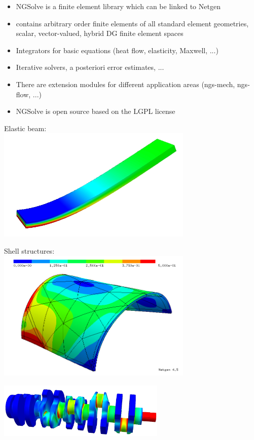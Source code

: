 \documentclass[20pt,landscape,footrule]{foils}
\begin{document}
\foilhead{\color{blue}
{\bf What is NGSolve ? } }
\begin{itemize}
\item NGSolve is a finite element library which can be linked to Netgen
\item contains arbitrary order finite elements of all standard element geometries,
scalar, vector-valued, hybrid DG finite element spaces
\item Integrators for basic equations (heat flow, elasticity, Maxwell, ...)
\item Iterative solvers, a posteriori error estimates, ...
\item There are extension modules for different application areas (ngs-mech, ngs-flow, ...)
\item NGSolve is open source based on the LGPL license
\end{itemize}


%
\begin{center}
\begin{minipage}[t]{0.4\textwidth}
Elastic beam: \\
\includegraphics[width=0.7\textwidth]{beam_sol.jpg}
\end{minipage}
\begin{minipage}[t]{0.4\textwidth}
Shell structures: \\
\includegraphics[width=0.7\textwidth]{shell3d.jpg}
\end{minipage}
\end{center}
\vspace{2ex}
\begin{center}
\includegraphics[width=0.6\textwidth]{crankshaft_cut.jpg}
\end{center}
\end{document}
